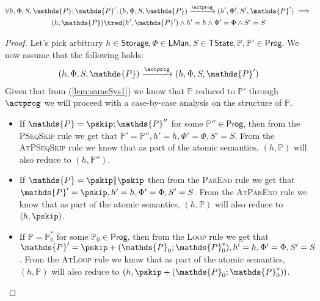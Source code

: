 \begin{lem}
	\label{lem:sameSys}
	\begin{gather*}
		\forall h, \Phi, S, \mathds{P}, \mathds{P}' \ldotp
		(h, \Phi, S, \mathds{P}) \xrightarrow{\actprog} (h', \Phi', S', \mathds{P}')
			\implies \\
		(h, \mathds{P}) \tred (h', \mathds{P}') \land h' = h \land \Phi' = \Phi \land S' = S
	\end{gather*}
	\begin{proof}
	Let's pick arbitrary $h \in \mathsf{Storage}, \Phi \in \mathsf{LMan}, S \in \mathsf{TState}, \mathds{P}, \mathds{P}' \in \mathsf{Prog}$. We now assume that the following holds:
	\begin{gather}
		\label{lem:sameSys1} (h, \Phi, S, \mathds{P}) \xrightarrow{\actprog} (h, \Phi, S, \mathds{P}')
	\end{gather}
	Given that from (\ref{lem:sameSys1}) we know that $\mathds{P}$ reduced to $\mathds{P'}$ through $\actprog$ we will proceed with a case-by-case analysis on the structure of $\mathds{P}$.
	\begin{itemize}
		\item If $\mathds{P} = \pskip ; \mathds{P}''$ for some $\mathds{P}'' \in \mathsf{Prog}$, then from the \textsc{PSeqSkip} rule we get that $\mathds{P}' = \mathds{P}'', h' = h, \Phi' = \Phi, S' = S$. From the \textsc{AtPSeqSkip} rule we know that as part of the atomic semantics, $(h, \mathds{P})$ will also reduce to $(h, \mathds{P}'')$.
		
		\item If $\mathds{P} = \pskip \| \pskip$ then from the \textsc{ParEnd} rule we get that $\mathds{P}' = \pskip, h' = h, \Phi' = \Phi, S' = S$. From the \textsc{AtParEnd} rule we know that as part of the atomic semantics, $(h, \mathds{P})$ will also reduce to $(h, \pskip)$.
		
		\item If $\mathds{P} = \mathds{P}_0^*$ for some $\mathds{P}_0 \in \mathsf{Prog}$, then from the \textsc{Loop} rule we get that $\mathds{P}' = \pskip + (\mathds{P}_0;\mathds{P}_0^*), h' = h, \Phi' = \Phi, S' = S$. From the \textsc{AtLoop} rule we know that as part of the atomic semantics, $(h, \mathds{P})$ will also reduce to $(h, \pskip + (\mathds{P}_0;\mathds{P}_0^*))$.
		

\end{itemize}
\end{proof}
\end{lem}
